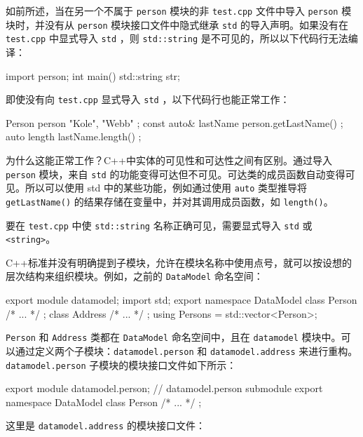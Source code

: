 
如前所述，当在另一个不属于 \verb|person| 模块的非 \verb|test.cpp| 文件中导入 \verb|person| 模块时，并没有从 \verb|person| 模块接口文件中隐式继承 \verb|std| 的导入声明。如果没有在 \verb|test.cpp| 中显式导入 \verb|std| ，则 \verb|std::string| 是不可见的，所以以下代码行无法编译：

\begin{cpp}
import person;
int main()
{
    std::string str;
}
\end{cpp}

即使没有向 \verb|test.cpp| 显式导入 \verb|std| ，以下代码行也能正常工作：

\begin{cpp}
Person person { "Kole", "Webb" };
const auto& lastName { person.getLastName() };
auto length { lastName.length() };
\end{cpp}

为什么这能正常工作？C++中实体的可见性和可达性之间有区别。通过导入 \verb|person| 模块，来自 \verb|std| 的功能变得可达但不可见。可达类的成员函数自动变得可见。所以可以使用 std 中的某些功能，例如通过使用 \verb|auto| 类型推导将 \verb|getLastName()| 的结果存储在变量中，并对其调用成员函数，如 \verb|length()|。

要在 \verb|test.cpp| 中使 \verb|std::string| 名称正确可见，需要显式导入 \verb|std| 或 \verb|<string>|。


C++标准并没有明确提到子模块，允许在模块名称中使用点号，就可以按设想的层次结构来组织模块。例如，之前的 \verb|DataModel| 命名空间：

\begin{cpp}
export module datamodel;
import std;
export namespace DataModel
{
    class Person { /* ... */ };
    class Address { /* ... */ };
    using Persons = std::vector<Person>;
}
\end{cpp}

\verb|Person| 和 \verb|Address| 类都在 \verb|DataModel| 命名空间中，且在 \verb|datamodel| 模块中。可以通过定义两个子模块：\verb|datamodel.person| 和 \verb|datamodel.address| 来进行重构。\verb|datamodel.person| 子模块的模块接口文件如下所示：

\begin{cpp}
export module datamodel.person; // datamodel.person submodule
export namespace DataModel { class Person { /* ... */ }; }
\end{cpp}

这里是 \verb|datamodel.address| 的模块接口文件：

